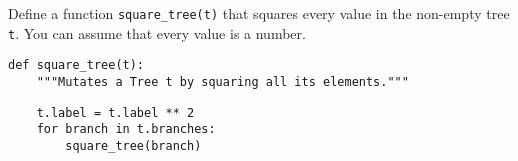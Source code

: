\question Define a function \texttt{square\_tree(t)} that squares every value in
the non-empty tree \texttt{t}. You can assume that every value is a number.

\begin{lstlisting}
def square_tree(t):
    """Mutates a Tree t by squaring all its elements."""
\end{lstlisting}
\begin{solution}[0.7in]
\begin{lstlisting}
    t.label = t.label ** 2
    for branch in t.branches:
        square_tree(branch)
\end{lstlisting}
\end{solution}
